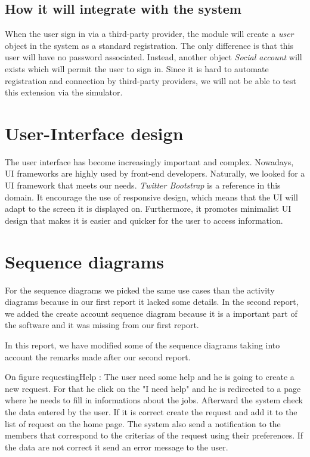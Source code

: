 \documentclass[11pt, a4paper]{article}   	%
\begin{document}
\subsection*{How it will integrate with the system}
When the user sign in via a third-party provider, the module will create a \textit{user} object in the system as a standard registration.
The only difference is that this user will have no password associated.
Instead, another object \textit{Social account} will exists which will permit the user to sign in.
Since it is hard to automate registration and connection by third-party providers, we will not be able to test this extension via the simulator.


\section{User-Interface design}
The user interface has become increasingly important and complex.
Nowadays, UI frameworks are highly used by front-end developers.
Naturally, we looked for a UI framework that meets our needs.
\textit{Twitter Bootstrap} is a reference in this domain.
It encourage the use of responsive design, which means that the UI will adapt to the screen it is displayed on.
Furthermore, it promotes minimalist UI design that makes it is easier and quicker for the user to access information.



\section{Sequence diagrams}

For the sequence diagrams we picked the same use cases than the activity diagrams because in our first report it lacked some details.
In the second report, we added the create account sequence diagram because it is a important part of the software and it was missing from our first report.

In this report, we have modified some of the sequence diagrams taking into account the remarks made after our second report.


On figure {requestingHelp} : The user need some help and he is going to create a new request. For that he click on the "I need help"
and he is redirected to a page where he needs to fill in informations about the jobs. Afterward the system check the data entered by the user.
If it is correct create the request and add it to the list of request on the home page. The system also send a notification to the members that
correspond to the criterias of the request using their preferences. If the data are not correct it send an error message to the user.
\end{document}
